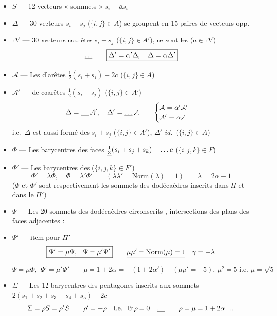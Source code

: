 \documentclass[11pt,a4paper]{article}
\begin{document}
\begin{itemize}
\item $S$ --- 12 vecteurs «  sommets » $s_i - \mathbf{a}s_i$
\item $\Delta$ --- 30 vecteurs  \struck{\ill{}} $s_i - s_j$ ($\{i,j\} \in A$) se groupent en 15 paires de vecteurs opp.
\item $\Delta'$ --- 30 vecteurs coarêtes $s_i - s_j$ ($\{i,j\} \in A'$), ce sont les \ill{} ($a \in \Delta'$)
\[
\struck{\ldots} \qquad \boxed{\Delta' = \alpha'\Delta, \quad \Delta = \alpha\Delta'}
\]
\item $\mathcal{A}$ --- Les   d'arêtes $\tfrac12(s_i + s_j) - 2c$ ($\{i,j\} \in A$)
\item $\mathcal{A}'$ ---  de coarêtes $\tfrac12(s_i + s_j)$ ($\{i,j\} \in A'$)
\[
\Delta = \struck{\ldots}\,\mathcal{A}', \quad \Delta' = \struck{\ldots}\,\mathcal{A}
\qquad
\begin{cases} \mathcal{A} = \alpha'\mathcal{A}' \\ \mathcal{A}' = \alpha\mathcal{A} \end{cases}
\]
i.e.\ $\Delta$ est aussi formé des $s_i + s_j$ ($\{i,j\} \in A'$), $\Delta'$ \textit{id.}\ ($\{i,j\} \in A$)
\item $\Phi$ --- Les  barycentres des faces $\uncertain{\tfrac13}(s_i + s_j + s_k) - \ldots c$ ($\{i,j,k\} \in F$)
\item $\Phi'$ --- Les  barycentres des  ($\{i,j,k\} \in F'$)
\[
\Phi' = \lambda\Phi, \quad \Phi = \lambda'\Phi' \qquad (\lambda\lambda' = \mathrm{Norm}(\lambda) = 1) \qquad \lambda = 2\alpha - 1
\]
($\Phi$ et $\Phi'$ sont respectivement les sommets des dodécaèdres inscrits dans $\Pi$ et dans le  $\Pi'$)
\item $\Psi$ --- Les 20 sommets  des dodécaèdres circonscrits , intersections des plans des faces adjacentes : \ill{}
\item $\Psi'$ --- item pour $\Pi'$
\[
\boxed{\Psi' = \mu\Psi, \ \ \Psi = \mu'\Psi'} \qquad \struck{\mu\mu' = \mathrm{Norm}(\mu) = 1} \quad \gamma = -\lambda
\]
\[
\boxed{\Psi = \mu\Phi, \ \ \Psi' = \mu'\Phi'} \qquad \mu = 1 + 2\alpha = -(1+2\alpha') \quad (\mu\mu' = -5),\ \mu^2 = 5 \text{ i.e. } \mu = \sqrt5
\]
\item $\Sigma$ --- Les 12  barycentres des pentagones inscrits aux sommets $2(s_1 + s_2 + s_3 + s_4 + s_5) - 2c$
\[
\Sigma = \rho S = \rho' S \qquad \rho' = -\rho \quad \text{i.e. } \mathrm{Tr}\,\rho = 0 \quad \struck{\ldots} \qquad \rho = \mu = 1 + 2\alpha\ldots
\]
\end{itemize}
\end{document}
